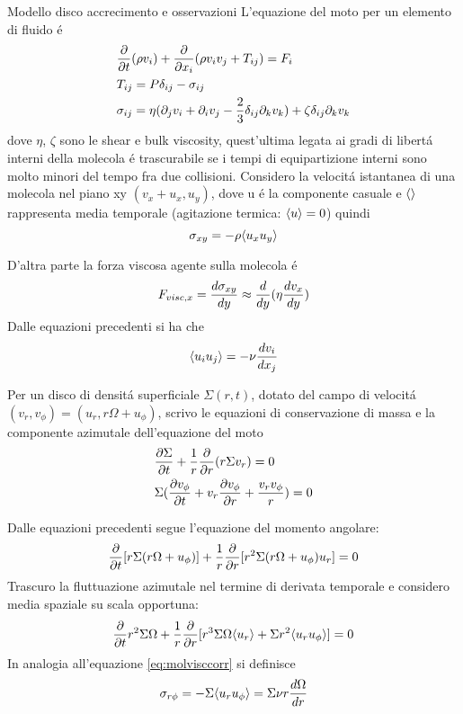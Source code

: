 \begin{reworking}{Modello disco accrecimento e osservazioni}
	L'equazione del moto per un elemento di fluido \'e
	\begin{align}
	&\PDof{t}(\rho v_i)+\PDof{x_i}(\rho v_iv_j+T_{ij})=F_i\label{eq:fluidmotion}\\
	&T_{ij}=P\delta_{ij}-\sigma_{ij}\\
	&\sigma_{ij}=\eta(\partial_jv_i+\partial_iv_j-\frac{2}{3}\delta_{ij}\partial_kv_k)+\zeta\delta_{ij}\partial_kv_k
	\end{align}
	dove $\eta$, $\zeta$ sono le shear e bulk viscosity, quest'ultima legata ai gradi di libert\'a interni della molecola \'e trascurabile se i tempi di equipartizione interni sono molto minori del tempo fra due collisioni.
	Considero la velocit\'a istantanea di una molecola nel piano xy $(v_x+u_x,u_y)$, dove u \'e la componente casuale e $\exv{}$ rappresenta media temporale (agitazione termica: $\exv{u}=0$) quindi
	\begin{equation}
	\sigma_{xy}=-\rho\exv{u_xu_y}
	\end{equation}
	
	D'altra parte la forza viscosa agente sulla molecola \'e
	\begin{equation}
	F_{visc,x}=\TDy{y}{\sigma_{xy}}\approx\TDof{y}(\eta\TDy{y}{v_x})
	\end{equation}
	Dalle equazioni precedenti si ha che
	\begin{equation}
	\exv{u_iu_j}=-\nu\TDy{x_j}{v_i}\label{eq:molvisccorr}
	\end{equation}
	
	Per un disco di densit\'a superficiale $\Sigma(r,t)$, dotato del campo di velocit\'a $(v_r,v_{\phi})=(u_r,r\Omega+u_{\phi})$, scrivo le equazioni di conservazione di massa e la componente azimutale dell'equazione del moto
	\begin{align}
	&\PDy{t}{\Sigma}+\frac{1}{r}\PDof{r}(r\Sigma v_r)=0\label{eq:massconservation}\\
	&\Sigma(\PDy{t}{v_{\phi}}+v_r\PDy{r}{v_{\phi}}+\frac{v_rv_{\phi}}{r})=0
	\end{align}
	
	Dalle equazioni precedenti segue l'equazione del momento angolare:
	\begin{equation}
	\PDof{t}[r\Sigma(r\Omega+u_{\phi})]+\frac{1}{r}\PDof{r}[r^2\Sigma(r\Omega+u_{\phi})u_r]=0
	\end{equation}
	Trascuro la fluttuazione azimutale nel termine di derivata temporale e considero media spaziale su scala opportuna:
	\begin{equation}
	\PDof{t}r^2\Sigma\Omega+\frac{1}{r}\PDof{r}[r^3\Sigma\Omega\exv{u_r}+\Sigma r^2\exv{u_ru_{\phi}}]=0\label{eq:smoothedangularmomentumequation}
	\end{equation}
	In analogia all'equazione \eqref{eq:molvisccorr} si definisce
	\begin{equation}
	\sigma_{r\phi}=-\Sigma\exv{u_ru_{\phi}}=\Sigma\nu r \TDy{r}{\Omega}
	\end{equation}
	

\end{reworking}
